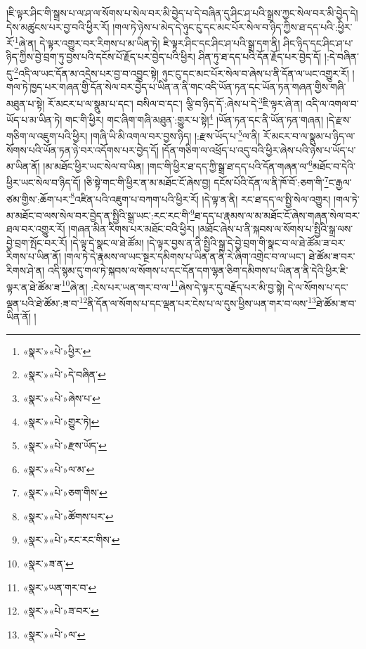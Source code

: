 །ཇི་ལྟར་ཤིང་གི་སྒྲས་པ་ལ་ཤ་ལ་སོགས་པ་སེལ་བར་མི་བྱེད་པ་དེ་བཞིན་དུ་ཤིང་ཤ་པའི་སྒྲས་ཀྱང་སེལ་བར་མི་བྱེད་དེ། དེས་མཚུངས་པར་བྱ་བའི་ཕྱིར་རོ། །གལ་ཏེ་ཉེས་པ་མེད་དེ་ཉུང་ངུ་དང་མང་པོར་སེལ་བ་ཉིད་ཀྱིས་ཐ་དད་པའི་:ཕྱིར་རོ་\footnote{«སྣར་»«པེ་»ཕྱིར་}ཞེ་ན། དེ་ལྟར་འགྱུར་བར་རིགས་པ་མ་ཡིན་ཏེ། ཇི་ལྟར་ཤིང་དང་ཤིང་ཤ་པའི་སྒྲ་དག་ནི། ཤིང་ཉིད་དང་ཤིང་ཤ་པ་ཉིད་ཀྱིས་བྱེ་བྲག་ཏུ་བྱས་པའི་དངོས་པོ་རྗོད་པར་བྱེད་པའི་ཕྱིར། ཤིན་ཏུ་ཐ་དད་པའི་དོན་རྗོད་པར་བྱེད་དོ། །:དེ་བཞིན་དུ་\footnote{«སྣར་»«པེ་»དེ་བཞིན་}འདི་ལ་ཡང་དོན་མ་འདྲེས་པར་བྱ་བ་འབྱུང་སྟེ། ཉུང་ངུ་དང་མང་པོར་སེལ་བ་ཞེས་པ་ནི་དོན་ལ་ཡང་འགྱུར་རོ། །གལ་ཏེ་ཁྱད་པར་གཞན་གྱི་དོན་སེལ་བར་བྱེད་པ་ཡིན་ན་ནི་གང་འདི་ཡོན་ཏན་དང་ཡོན་ཏན་གཞན་གྱིས་གཞི་མཐུན་པ་སྟེ། རོ་མངར་པ་ལ་སྣུམ་པ་དང་། བསིལ་བ་དང་། ལྕི་བ་ཉིད་དོ་:ཞེས་པ་དེ་\footnote{«སྣར་»«པེ་»ཞེས་པ་}ཇི་ལྟར་ཞེ་ན། འདི་ལ་འགལ་བ་ཡོད་པ་མ་ཡིན་ཏེ། གང་གི་ཕྱིར། གང་ཞིག་གཞི་མཐུན་:གྱུར་པ་སྟེ།\footnote{«སྣར་»«པེ་»གྱུར་ཏེ།} །ཡོན་ཏན་དང་ནི་ཡོན་ཏན་གཞན། །དེ་རྫས་གཅིག་ལ་འཇུག་པའི་ཕྱིར། །གཞི་ཡི་མི་འགལ་བར་བྱས་ཉིད། །:རྫས་ཡོད་པ་\footnote{«སྣར་»«པེ་»རྫས་ཡོད་}ལ་ནི། རོ་མངར་བ་ལ་སྣུམ་པ་ཉིད་ལ་སོགས་པའི་ཡོན་ཏན་ཉེ་བར་འདོགས་པར་བྱེད་དོ། །དོན་གཅིག་ལ་འཕྲོད་པ་འདུ་བའི་ཕྱིར་ཞེས་པའི་ཉེས་པ་ཡོད་པ་མ་ཡིན་ནོ། །མ་མཐོང་ཕྱིར་ཡང་སེལ་བ་ཡིན། །གང་གི་ཕྱིར་ཐ་དད་ཀྱི་སྒྲ་ཐ་དད་པའི་དོན་གཞན་ལ་\footnote{«སྣར་»«པེ་»ལ་མ་}མཐོང་བ་དེའི་ཕྱིར་ཡང་སེལ་བ་ཉིད་དོ། །ཅི་སྟེ་གང་གི་ཕྱིར་ན་མ་མཐོང་ངོ་ཞེས་བྱ། དངོས་པོའི་དོན་ལ་ནི་ཁོ་བོ་:ཅག་གི་\footnote{«སྣར་»«པེ་»ཅག་གིས་}ང་རྒྱལ་ཙམ་གྱིས་:ཆོག་པར་\footnote{«སྣར་»«པེ་»ཚོགས་པར་}འཛིན་པའི་འཇུག་པ་བཀག་པའི་ཕྱིར་རོ། །དེ་ལྟ་ན་ནི། རང་ཐ་དད་ལ་སྤྱི་སེལ་འགྱུར། །གལ་ཏེ་མ་མཐོང་བ་ལས་སེལ་བར་བྱེད་ན་སྤྱིའི་སྒྲ་ཡང་:རང་རང་གི་\footnote{«སྣར་»«པེ་»རང་རང་གིས་}ཐ་དད་པ་རྣམས་ལ་མ་མཐོང་ངོ་ཞེས་གཞན་སེལ་བར་ཐལ་བར་འགྱུར་རོ། །གཞན་མིན་རིགས་པར་མཐོང་བའི་ཕྱིར། །མཐོང་ཞེས་པ་ནི་སྐབས་ལ་སོགས་པ་སྤྱིའི་སྒྲ་ལས་བྱེ་བྲག་སྤོང་བར་རོ། །དེ་ལྟ་དེ་སྣང་ལ་ཐེ་ཚོམ། །དེ་ལྟར་བྱས་ན་ནི་སྤྱིའི་སྒྲ་དེ་བྱེ་བྲག་གི་སྣང་བ་ལ་ཐེ་ཚོམ་ཟ་བར་རིགས་པ་ཡིན་ནོ། །གལ་ཏེ་དེ་རྣམས་ལ་ཡང་སྔར་དམིགས་པ་ཡིན་ན་ནི་རེ་ཞིག་འགྲེང་བ་ལ་ཡང་། ཐེ་ཚོམ་ཟ་བར་རིགས་ཤེ་ན། འདི་སྙམ་དུ་གལ་ཏེ་སྐབས་ལ་སོགས་པ་དང་དོན་དག་ལྷན་ཅིག་དམིགས་པ་ཡིན་ན་ནི་དེའི་ཕྱིར་ཇི་ལྟར་ན་ཐེ་ཚོམ་ཟ་\footnote{«སྣར་»ཟ་ན་}ཞེ་ན། :ངེས་པར་ཡན་གར་བ་ལ་\footnote{«སྣར་»ཡན་གར་བ་}ཞེས་དེ་ལྟར་དུ་བརྗོད་པར་མི་བྱ་སྟེ། དེ་ལ་སོགས་པ་དང་ལྡན་པའི་ཐེ་ཚོམ་:ཟ་བ་\footnote{«སྣར་»«པེ་»ཟ་བར་}ནི་དོན་ལ་སོགས་པ་དང་ལྡན་པར་ངེས་པ་ལ་དུས་ཕྱིས་ཡན་གར་བ་ལས་\footnote{«སྣར་»«པེ་»ལ་}ཐེ་ཚོམ་ཟ་བ་ཡིན་ནོ། །

